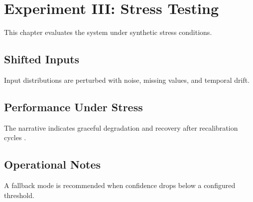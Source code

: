 \chapter{Experiment III: Stress Testing}
\label{chap:exp3}

This chapter evaluates the system under synthetic stress conditions.

\section{Shifted Inputs}
Input distributions are perturbed with noise, missing values, and temporal drift.

\section{Performance Under Stress}
The narrative indicates graceful degradation and recovery after recalibration cycles \cite{kim2021reliable,roberts2020uncertainty}.

\section{Operational Notes}
A fallback mode is recommended when confidence drops below a configured threshold.
